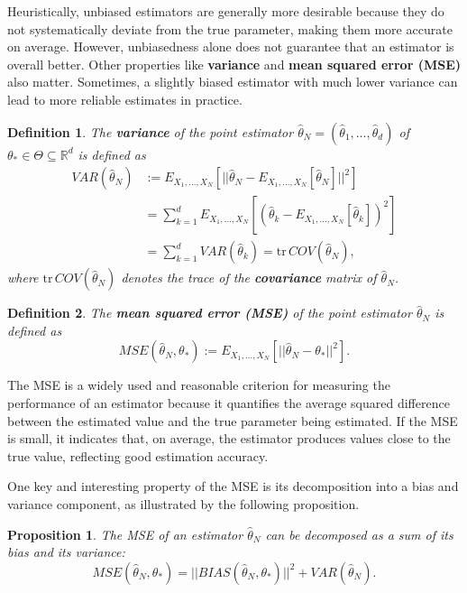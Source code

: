 \documentclass{report}
\newtheorem{definition}{Definition}[chapter]
\newtheorem{proposition}{Proposition}[chapter]
\begin{document}
Heuristically, unbiased estimators are generally more desirable because they do not systematically deviate from the true parameter, making them more accurate on average. However, unbiasedness alone does not guarantee that an estimator is overall better. Other properties like \textbf{variance} and \textbf{mean squared error (MSE)} also matter. Sometimes, a slightly biased estimator with much lower variance can lead to more reliable estimates in practice.

\begin{definition}
The \textbf{variance} of the point estimator $\hat{\theta}_N = (\hat{\theta}_{1},\dots,\hat{\theta}_{d})$ of $\theta_* \in \Theta \subseteq \mathbb{R}^d$ is defined as
\begin{equation}
\begin{split}
VAR(\hat{\theta}_N) & := E_{X_1,\dots,X_N}[||\hat{\theta}_N-E_{X_1,\dots,X_N}[\hat{\theta}_N]||^2] \\
& = \sum_{k=1}^{d}E_{X_1,\dots,X_N}[(\hat{\theta}_{k}-E_{X_1,\dots,X_N}[\hat{\theta}_{k}])^2] \\
& = \sum_{k=1}^{d}VAR(\hat{\theta}_{k}) = \mathrm{tr}\,COV(\hat{\theta}_N),
\end{split}
\end{equation}
where $\mathrm{tr}\,COV(\hat{\theta}_N)$ denotes the trace of the \textbf{covariance} matrix of $\hat{\theta}_N$.
\end{definition}

\begin{definition}
The \textbf{mean squared error (MSE)} of the point estimator $\hat{\theta}_N$ is defined as
\begin{equation}
MSE(\hat{\theta}_N,\theta_*) := E_{X_1,\dots,X_N}[||\hat{\theta}_N - \theta_*||^2].
\end{equation}
\end{definition}

The MSE is a widely used and reasonable criterion for measuring the performance of an estimator because it quantifies the average squared difference between the estimated value and the true parameter being estimated. If the MSE is small, it indicates that, on average, the estimator produces values close to the true value, reflecting good estimation accuracy.

One key and interesting property of the MSE is its decomposition into a bias and variance component, as illustrated by the following proposition.

\begin{proposition}
The MSE of an estimator $\hat{\theta}_N$ can be decomposed as a sum of its bias and its variance:
\begin{equation}
MSE(\hat{\theta}_N,\theta_*) = ||BIAS(\hat{\theta}_N,\theta_*)||^2 + VAR(\hat{\theta}_N).
\end{equation}
\end{proposition}
\end{document}
